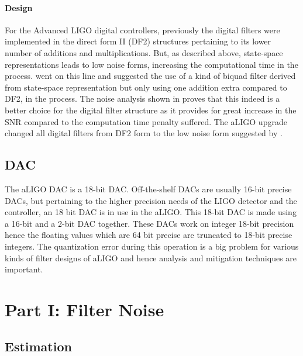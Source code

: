 \documentclass[colorlinks=true,pdfstartview=FitV,linkcolor=blue,
            citecolor=red,urlcolor=magenta]{ligodoc}
\begin{document}
    		\paragraph{Design}
    		
For the Advanced LIGO digital controllers, previously the digital filters were implemented in  the direct form II (DF2) structures pertaining to its lower number of additions and multiplications.
But, as described above, state-space representations leads to low noise forms, increasing the computational time in the process. \cite{Matts} went on this line and suggested the use of a kind of biquad filter derived from state-space representation but only using one addition extra compared to DF2, in the process. The noise analysis shown in \cite{Matts} proves that this indeed is a better choice for the digital filter structure as it provides for great increase in the SNR compared to the computation time penalty suffered. The aLIGO upgrade changed all digital filters from DF2 form to the low noise form suggested by \cite{Matts}.

	\subsection{DAC}
	The aLIGO DAC is a 18-bit DAC. Off-the-shelf DACs are usually 16-bit precise DACs, but pertaining to the higher precision needs of the LIGO detector and the controller, an 18 bit DAC is in use in the aLIGO. This 18-bit DAC is made using a 16-bit and a 2-bit DAC together. These DACs work on integer 18-bit precision hence the floating values which are 64 bit precise are truncated to 18-bit precise integers. The quantization error during this operation is a big problem for various kinds of filter designs of aLIGO and hence analysis and mitigation techniques are important. 

\section{Part I: Filter Noise}
	\subsection{Estimation}
	
\end{document}
